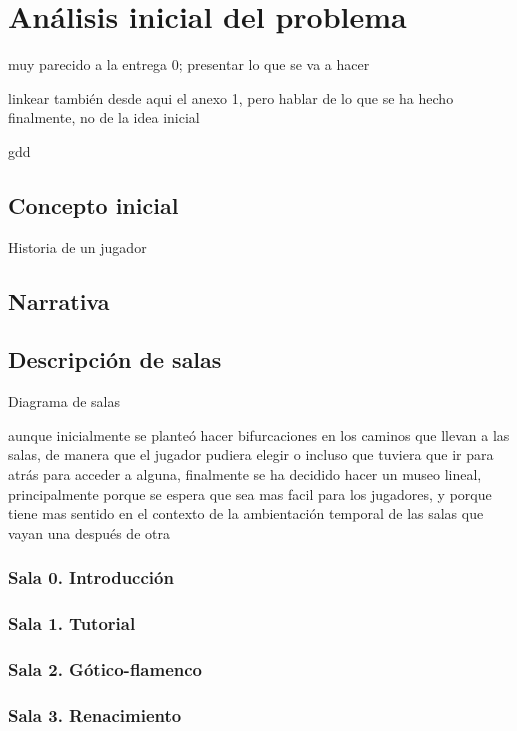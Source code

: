 \chapter{Análisis inicial del problema}
\label{chap:analisis_problema}

muy parecido a la entrega 0; presentar lo que se va a hacer

linkear también desde aqui el anexo 1, pero hablar de lo que se ha hecho finalmente, no de la idea inicial

gdd

\section{Concepto inicial}

Historia de un jugador

\section{Narrativa}

\section{Descripción de salas}

Diagrama de salas

aunque inicialmente se planteó hacer bifurcaciones en los caminos que llevan a las salas, de manera que el jugador pudiera elegir o incluso que tuviera que ir para atrás para acceder a alguna, finalmente se ha decidido hacer un museo lineal, principalmente porque se espera que sea mas facil para los jugadores, y porque tiene mas sentido en el contexto de la ambientación temporal de las salas que vayan una después de otra


\subsection{Sala 0. Introducción}

\subsection{Sala 1. Tutorial}

\subsection{Sala 2. Gótico-flamenco}

\subsection{Sala 3. Renacimiento}

